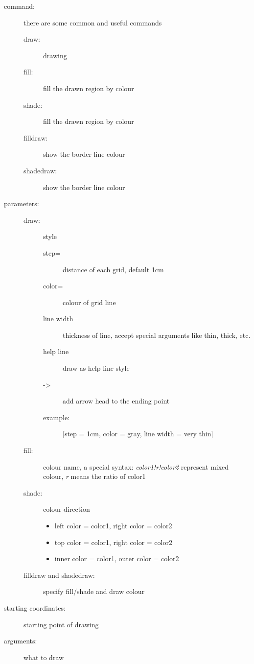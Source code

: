 \documentclass[12pt, a4paper]{article}
\begin{document}
\begin{description}
\item[command:] there are some common and useful commands
	\begin{description}
	\item[draw:] drawing
	\item[fill:] fill the drawn region by colour
	\item[shade:] fill the drawn region by colour
	\item[filldraw:] show the border line colour
	\item[shadedraw:] show the border line colour
	\end{description}
\item[parameters:]
	\begin{description}
	\item[draw:] style
		\begin{description}
		\item[step=] distance of each grid, default 1cm
		\item[color=] colour of grid line
		\item[line width=] thickness of line, accept special arguments like thin, thick, etc.
		\item[help line] draw as help line style
		\item[->] add arrow head to the ending point
		\item[example:] [step = 1cm, color = gray, line width = very thin]
		\end{description}
	\item[fill:] colour name, a special syntax: \emph{color1!r!color2} represent mixed colour, \emph{r} means the ratio of color1
	\item[shade:] colour direction
		\begin{itemize}
		\item left color = color1, right color = color2
		\item top color = color1, right color = color2
		\item inner color = color1, outer color = color2
		\end{itemize}
	\item[filldraw and shadedraw:] specify fill/shade and draw colour\\
	\end{description}
\item[starting coordinates:] starting point of drawing
\item[arguments:] what to draw
	\begin{itemize}

\end{itemize}
\end{description}
\end{document}
